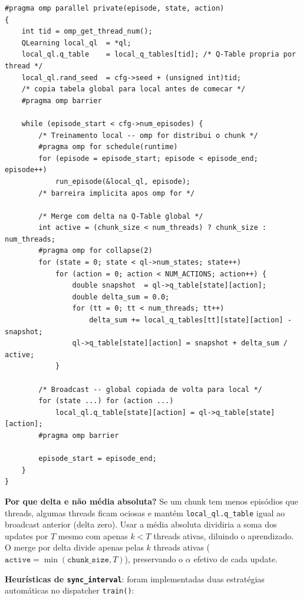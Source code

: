 \documentclass[12pt]{article}
\begin{document}
\begin{lstlisting}[caption={Regiao paralela de train com sincronizacao (parallel\_qlearning\_cli.c)}]
#pragma omp parallel private(episode, state, action)
{
    int tid = omp_get_thread_num();
    QLearning local_ql  = *ql;
    local_ql.q_table    = local_q_tables[tid]; /* Q-Table propria por thread */
    local_ql.rand_seed  = cfg->seed + (unsigned int)tid;
    /* copia tabela global para local antes de comecar */
    #pragma omp barrier

    while (episode_start < cfg->num_episodes) {
        /* Treinamento local -- omp for distribui o chunk */
        #pragma omp for schedule(runtime)
        for (episode = episode_start; episode < episode_end; episode++)
            run_episode(&local_ql, episode);
        /* barreira implicita apos omp for */

        /* Merge com delta na Q-Table global */
        int active = (chunk_size < num_threads) ? chunk_size : num_threads;
        #pragma omp for collapse(2)
        for (state = 0; state < ql->num_states; state++)
            for (action = 0; action < NUM_ACTIONS; action++) {
                double snapshot  = ql->q_table[state][action];
                double delta_sum = 0.0;
                for (tt = 0; tt < num_threads; tt++)
                    delta_sum += local_q_tables[tt][state][action] - snapshot;
                ql->q_table[state][action] = snapshot + delta_sum / active;
            }

        /* Broadcast -- global copiada de volta para local */
        for (state ...) for (action ...)
            local_ql.q_table[state][action] = ql->q_table[state][action];
        #pragma omp barrier

        episode_start = episode_end;
    }
}
\end{lstlisting}

\textbf{Por que delta e não média absoluta?} Se um chunk tem menos episódios que
threads, algumas threads ficam ociosas e mantém \texttt{local\_ql.q\_table} igual
ao broadcast anterior (delta zero). Usar a média absoluta dividiria a soma dos
updates por \(T\) mesmo com apenas \(k < T\) threads ativas, diluindo o
aprendizado. O merge por delta divide apenas pelas \(k\) threads ativas
(\(\texttt{active} = \min(\texttt{chunk\_size}, T)\)), preservando o \(\alpha\)
efetivo de cada update.

\textbf{Heurísticas de \texttt{sync\_interval}}: foram implementadas duas estratégias
automáticas no dispatcher \texttt{train()}:
\end{document}
